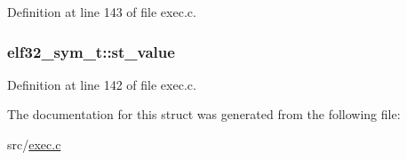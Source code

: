 Definition at line 143 of file exec.\+c.

\hypertarget{structelf32__sym__t_ae0b3ec7941f44c78c2328c7071144062}{
\subsubsection[{st\+\_\+value}]{ elf32\+\_\+sym\+\_\+t\+::st\+\_\+value}}\label{structelf32__sym__t_ae0b3ec7941f44c78c2328c7071144062}


Definition at line 142 of file exec.\+c.



The documentation for this struct was generated from the following file\+:\begin{DoxyCompactItemize}
\item 
src/\hyperlink{exec_8c}{exec.\+c}\end{DoxyCompactItemize}
